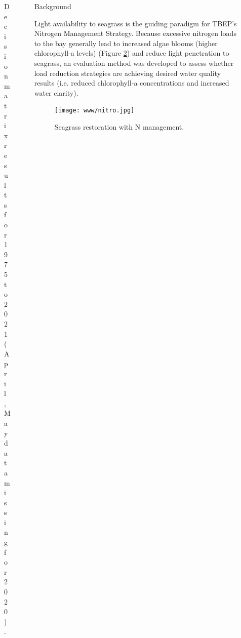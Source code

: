 \documentclass[final,t]{beamer}\usepackage[]{graphicx}\usepackage[]{color}
\begin{document}
\begin{frame}
\begin{columns}[t]
\begin{column}{.2\linewidth}
\begin{figure}
\caption{\footnotesize Decision matrix results for 1975 to 2021 (April, May data missing for 2020).}
\label{fig:attainmat}
\end{figure}

\end{column}

\begin{column}{.79\linewidth}

\begin{block}{Background}
\begin{minipage}{0.5\textwidth}
\vspace{-0.2in}
\footnotesize
Light availability to seagrass is the guiding paradigm for TBEP's Nitrogen Management Strategy. Because excessive nitrogen loads to the bay generally lead to increased algae blooms (higher chlorophyll-a levels) (Figure \ref{fig:nitro}) and reduce light penetration to seagrass, an evaluation method was developed to assess whether load reduction strategies are achieving desired water quality results (i.e. reduced chlorophyll-a concentrations and increased water clarity).
\end{minipage}
\hspace{0.1in}
\begin{minipage}{0.45\textwidth}
\begin{figure}
\texttt{[image: www/nitro.jpg]}
\caption{\footnotesize Seagrass restoration with N management.}
\label{fig:nitro}
\end{figure}
\end{minipage}
\vspace{-0.2in}
\end{block}


\end{column}
\end{columns}
\end{frame}
\end{document}
